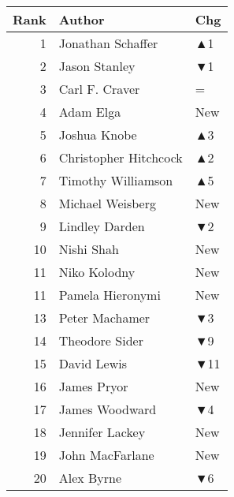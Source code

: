 \documentclass[
  10pt,
  letterpaper,
  DIV=11,
  numbers=noendperiod,
  twoside]{scrartcl}
\begin{document}
\begin{table}
\begin{minipage}{0.33\linewidth}
{\begin{tabular}{rll}
\toprule
Rank & Author & Chg\\
\midrule
1 & Jonathan Schaffer & \textcolor[RGB]{34,178,34}{▲1}\\
2 & Jason Stanley & \textcolor[RGB]{178,34,34}{▼1}\\
3 & Carl F. Craver & =\\
4 & Adam Elga & \textcolor[RGB]{34,178,34}{New}\\
5 & Joshua Knobe & \textcolor[RGB]{34,178,34}{▲3}\\
6 & Christopher Hitchcock & \textcolor[RGB]{34,178,34}{▲2}\\
7 & Timothy Williamson & \textcolor[RGB]{34,178,34}{▲5}\\
8 & Michael Weisberg & \textcolor[RGB]{34,178,34}{New}\\
9 & Lindley Darden & \textcolor[RGB]{178,34,34}{▼2}\\
10 & Nishi Shah & \textcolor[RGB]{34,178,34}{New}\\
11 & Niko Kolodny & \textcolor[RGB]{34,178,34}{New}\\
11 & Pamela Hieronymi & \textcolor[RGB]{34,178,34}{New}\\
13 & Peter Machamer & \textcolor[RGB]{178,34,34}{▼3}\\
14 & Theodore Sider & \textcolor[RGB]{178,34,34}{▼9}\\
15 & David Lewis & \textcolor[RGB]{178,34,34}{▼11}\\
16 & James Pryor & \textcolor[RGB]{34,178,34}{New}\\
17 & James Woodward & \textcolor[RGB]{178,34,34}{▼4}\\
18 & Jennifer Lackey & \textcolor[RGB]{34,178,34}{New}\\
19 & John MacFarlane & \textcolor[RGB]{34,178,34}{New}\\
20 & Alex Byrne & \textcolor[RGB]{178,34,34}{▼6}\\
\bottomrule
\end{tabular}

}

\end{minipage}%
%
\begin{minipage}{0.33\linewidth}


\centering{

}
\end{minipage}
\end{table}
\end{document}
